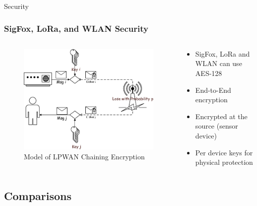 \documentclass{beamer}
\begin{document}
  \begin{frame}{Security}
    \frametitle{SigFox, LoRa, and WLAN Security}
    \begin{columns}
      \begin{column}{0.5\textwidth}
        \begin{figure}[htbp]
          \centering
          \includegraphics[width=\textwidth]{images/Model-of-LPWAN-Chaining-Encryption.png}
          \caption{Model of LPWAN Chaining Encryption \cite{bidgoly2019novel}}
          \label{fig:LPWAN_encryption}
        \end{figure}
      \end{column}
      \begin{column}{0.5\textwidth}
        \begin{itemize}
          \item SigFox, LoRa and WLAN can use AES-128
          \item End-to-End encryption
          \item Encrypted at the source (sensor device)
          \item Per device keys for physical protection
        \end{itemize}
      \end{column}
    \end{columns}
  \end{frame}

\subsection{Comparisons}
\end{document}
